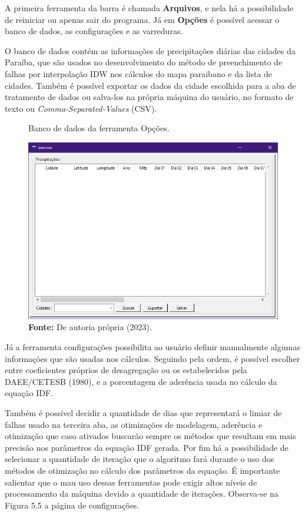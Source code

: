 A primeira ferramenta da barra é chamada \textbf{Arquivos}, e nela há a possibilidade de reiniciar ou apenas sair do programa. Já em \textbf{Opções} é possível acessar o banco de dados, as configurações e as varreduras.

O banco de dados contém as informações de precipitações diárias das cidades da Paraíba, que são usados no desenvolvimento do método de preenchimento de falhas por interpolação IDW nos cálculos do mapa paraibano e da lista de cidades. Também é possível exportar os dados da cidade escolhida para a aba de tratamento de dados ou salva-los na própria máquina do usuário, no formato de texto ou \textit{Comma-Separated-Values} (CSV).\bigskip

\begin{figure}[!ht]
	\centering
	\caption{Banco de dados da ferramenta Opções.}
	\includegraphics[width=.7625\linewidth]{figuras/banco_de_dados.png}
	\caption*{\textbf{Fonte:} De autoria própria (2023).}
	\label{fig:banco_de_dados.png}
\end{figure}

Já a ferramenta configurações possibilita ao usuário definir manualmente algumas informações que são usadas nos cálculos. Seguindo pela ordem, é possível escolher entre coeficientes próprios de desagregação ou os estabelecidos pela DAEE/CETESB (1980), e a porcentagem de aderência usada no cálculo da equação IDF.

Também é possível decidir a quantidade de dias que representará o limiar de falhas usado na terceira aba, as otimizações de modelagem, aderência e otimização que caso ativados buscarão sempre os métodos que resultam em mais precisão nos parâmetros da equação IDF gerada. Por fim há a possibilidade de selecionar a quantidade de iteração que o algoritmo fará durante o uso dos métodos de otimização no cálculo dos parâmetros da equação. É importante salientar que o mau uso dessas ferramentas pode exigir altos níveis de processamento da máquina devido a quantidade de iterações. Observa-se na Figura 5.5 a página de configurações.

